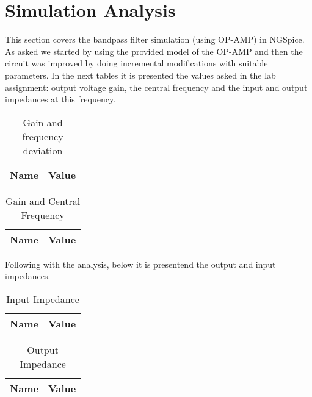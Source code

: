 \section{Simulation Analysis}
\label{sec:simulation}

\hspace{0,5cm} This section covers the bandpass filter simulation (using OP-AMP) in NGSpice. As asked we started by using the provided model of the OP-AMP and then the circuit was improved by doing incremental modifications with suitable parameters. In the next tables it is presented the values asked in the lab assignment: output voltage gain, the central frequency and the input and output impedances at this frequency.

\begin{table}[!ht]
  \centering
  \begin{tabular}{|l|r|}
    \hline    
    {\bf Name} & {\bf Value } \\ \hline
    
  \end{tabular}
  \caption{Gain and frequency deviation}
  \label{tab:ng2}
\end{table}

\begin{table}[!ht]
  \centering
  \begin{tabular}{|l|r|}
    \hline    
    {\bf Name} & {\bf Value } \\ \hline
    
  \end{tabular}
  \caption{Gain and Central Frequency}
  \label{tab:ng3}
\end{table}

\par Following with the analysis, below it is presentend the output and input impedances.

\begin{table}[!ht]
  \centering
  \begin{tabular}{|l|r|}
    \hline    
    {\bf Name} & {\bf Value } \\ \hline
    
  \end{tabular}
  \caption{Input Impedance}
  \label{tab:ng4}
\end{table}

\begin{table}[!ht]
  \centering
  \begin{tabular}{|l|r|}
    \hline    
    {\bf Name} & {\bf Value } \\ \hline
    
  \end{tabular}
  \caption{Output Impedance}
  \label{tab:ng4}
\end{table}

